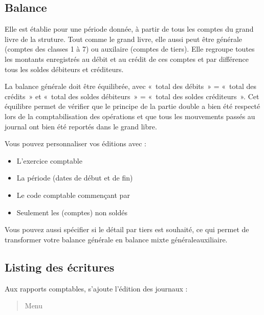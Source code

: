 \documentclass[a4paper,10pt,oneside,french]{sphinxmanual}
\begin{document}
\subsection{Balance}
\label{\detokenize{accounting/reporting:balance}}
\sphinxAtStartPar
Elle est établie pour une période donnée, à partir de tous les comptes du grand livre de la struture. Tout comme le grand livre, elle aussi peut être générale (comptes des classes 1 à 7) ou auxilaire (comptes de tiers). Elle regroupe toutes les montants enregistrés au débit et au crédit de ces comptes et par différence tous les soldes débiteurs et créditeurs.

\sphinxAtStartPar
La balance générale doit être équilibrée, avec « total des débits » = « total des crédits » et « total des soldes débiteurs » = « total des soldes créditeurs ». Cet équilibre permet de vérifier que le principe de la partie double a bien été respecté lors de la comptabilisation des opérations et que tous les mouvements passés au journal ont bien été reportés dans le grand libre.

\sphinxAtStartPar
Vous pouvez personnaliser vos éditions avec :
\begin{itemize}
\item {} 
\sphinxAtStartPar
L’exercice comptable

\item {} 
\sphinxAtStartPar
La période (dates de début et de fin)

\item {} 
\sphinxAtStartPar
Le code comptable commençant par

\item {} 
\sphinxAtStartPar
Seulement les (comptes) non soldés

\end{itemize}

\sphinxAtStartPar
Vous pouvez aussi spécifier si le détail par tiers est souhaité, ce qui permet de transformer votre balance générale en balance mixte générale\sphinxhyphen{}auxiliaire.


\subsection{Listing des écritures}
\label{\detokenize{accounting/reporting:listing-des-ecritures}}
\sphinxAtStartPar
Aux rapports comptables, s’ajoute l’édition des journaux :
\begin{quote}

\sphinxAtStartPar
Menu 
\end{quote}
\end{document}
